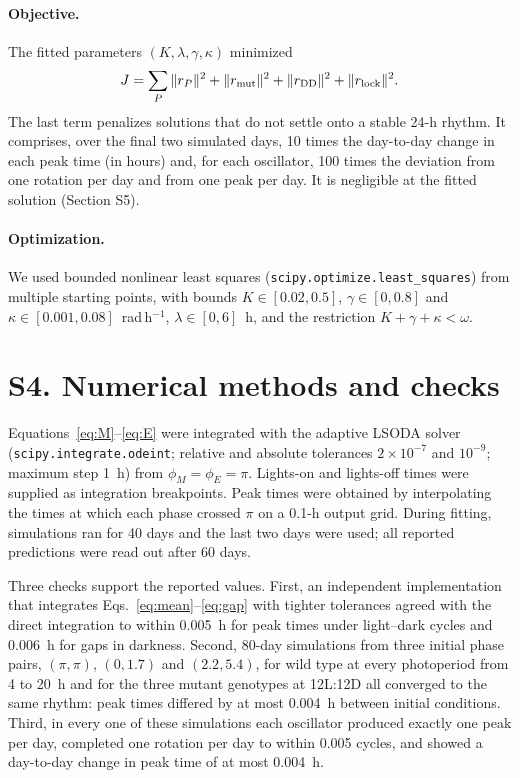 \documentclass[10pt,a4paper]{article}
\begin{document}
\paragraph{Objective.}
The fitted parameters $(K,\lambda,\gamma,\kappa)$ minimized
\begin{equation}
 J=\sum_P\|r_P\|^2+\|r_{\rm mut}\|^2
                         +\|r_{\rm DD}\|^2+\|r_{\rm lock}\|^2.
\end{equation}
The last term penalizes solutions that do not settle onto a stable 24-h
rhythm. It comprises, over the final two simulated days, 10 times the
day-to-day change in each peak time (in hours) and, for each oscillator,
100 times the deviation from one rotation per day and from one peak per
day. It is negligible at the fitted solution (Section S5).

\paragraph{Optimization.}
We used bounded nonlinear least squares
(\texttt{scipy.optimize.least\_squares}) from multiple starting points,
with bounds $K\in[0.02,0.5]$, $\gamma\in[0,0.8]$ and
$\kappa\in[0.001,0.08]$~rad\,h$^{-1}$, $\lambda\in[0,6]$~h, and the
restriction $K+\gamma+\kappa<\omega$.

\section*{S4. Numerical methods and checks}
Equations~\eqref{eq:M}--\eqref{eq:E} were integrated with the adaptive
LSODA solver (\texttt{scipy.integrate.odeint}; relative and absolute
tolerances $2\times10^{-7}$ and $10^{-9}$; maximum step 1~h) from
$\phi_M=\phi_E=\pi$. Lights-on and lights-off times were supplied as
integration breakpoints. Peak times were obtained by interpolating the
times at which each phase crossed $\pi$ on a 0.1-h output grid. During
fitting, simulations ran for 40 days and the last two days were used;
all reported predictions were read out after 60 days.

Three checks support the reported values. First, an independent
implementation that integrates Eqs.~\eqref{eq:mean}--\eqref{eq:gap}
with tighter tolerances agreed with the direct integration to within
0.005~h for peak times under light--dark cycles and 0.006~h for gaps in
darkness. Second, 80-day simulations from three initial phase pairs,
$(\pi,\pi)$, $(0,1.7)$ and $(2.2,5.4)$, for wild type at every
photoperiod from 4 to 20~h and for the three mutant genotypes at 12L:12D
all converged to the same rhythm: peak times differed by at most
0.004~h between initial conditions. Third, in every one of these
simulations each oscillator produced exactly one peak per day, completed
one rotation per day to within 0.005 cycles, and showed a day-to-day
change in peak time of at most 0.004~h.
\end{document}
